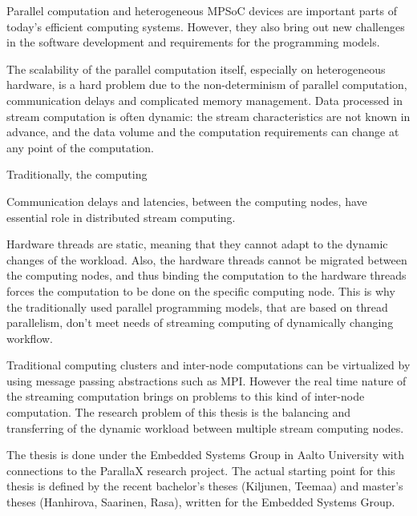 Parallel computation and heterogeneous MPSoC devices are important parts of today's efficient computing systems. However, they also bring out new challenges in the software development and requirements for the programming models.

The scalability of the parallel computation itself, especially on heterogeneous hardware, is a hard problem due to the non-determinism of parallel computation, communication delays and complicated memory management. Data processed in stream computation is often dynamic: the stream characteristics are not known in advance, and the data volume and the computation requirements can change at any point of the computation.

Traditionally, the computing

Communication delays and latencies, between the computing nodes, have essential role in distributed stream computing.

Hardware threads are static, meaning that they cannot adapt to the dynamic changes of the workload. Also, the hardware threads cannot be migrated between the computing nodes, and thus binding the computation to the hardware threads forces the computation to be done on the specific computing node. This is why the traditionally used parallel programming models, that are based on thread parallelism, don't meet needs of streaming computing of dynamically changing workflow.

Traditional computing clusters and inter-node computations can be virtualized by using message passing abstractions such as MPI. However the real time nature of the streaming computation brings on problems to this kind of inter-node computation. The research problem of this thesis is the balancing and transferring of the dynamic workload between multiple stream computing nodes.

The thesis is done under the Embedded Systems Group in Aalto University with connections to the ParallaX research project. The actual starting point for this thesis is defined by the recent bachelor's theses (Kiljunen, Teemaa) and master's theses (Hanhirova, Saarinen, Rasa), written for the Embedded Systems Group.

